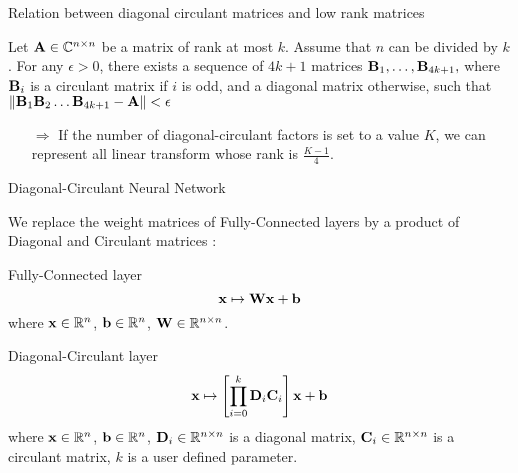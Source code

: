 \begin{frame}{Relation between diagonal circulant matrices and low rank matrices}
      
  \begin{theorem} Let $\mathbf{A} \in \mathbb{C}^{n \times n}$ be
  a matrix of rank at most $k$. Assume that $n$ can be divided by $k$. For
  any $\epsilon > 0$, there exists a sequence of $4k+1$ matrices $\mathbf{B}_{1}, \dots, \mathbf{B}_{4k+1},$ where $\mathbf{B}_{i}$ is a circulant matrix if $i$ is odd, and a diagonal matrix otherwise, such that $\norm{\mathbf{B}_1\mathbf{B}_2 \dots \mathbf{B}_{4k+1} - \mathbf{A}} < \epsilon$
  \end{theorem}

  \vspace{0.5cm}


  \begin{itemize}
    \item[$\Rightarrow$] If the number of diagonal-circulant factors is set to a value $K$, we can represent all linear transform whose rank is $\frac{K - 1}{4}$.
  \end{itemize}
\end{frame}


\begin{frame}{Diagonal-Circulant Neural Network}

  We replace the weight matrices of Fully-Connected layers by a product of Diagonal and Circulant matrices :

  \begin{block}{Fully-Connected layer}
  \begin{equation*}
      \mathbf{x} \mapsto \mathbf{W} \mathbf{x} + \mathbf{b}
  \end{equation*}
  where $\mathbf{x} \in {\ensuremath \mathbb{R}}^n$, $\mathbf{b} \in {\ensuremath \mathbb{R}}^n$, $\mathbf{W} \in {\ensuremath \mathbb{R}}^{n \times n}$.
  \end{block}

  \begin{block}{Diagonal-Circulant layer}
  \begin{equation*}
      \mathbf{x} \mapsto \left[ \prod_{i=0}^{k} \mathbf{D}_i \mathbf{C}_i \right] \mathbf{x} + \mathbf{b}
  \end{equation*}
  where $\mathbf{x} \in {\ensuremath \mathbb{R}}^n$, $\mathbf{b} \in {\ensuremath \mathbb{R}}^n$, $\mathbf{D}_i \in {\ensuremath \mathbb{R}}^{n \times n}$ is a diagonal matrix, $\mathbf{C}_i \in {\ensuremath \mathbb{R}}^{n \times n}$ is a circulant matrix, $k$ is a user defined parameter.
  \end{block}

\end{frame}





